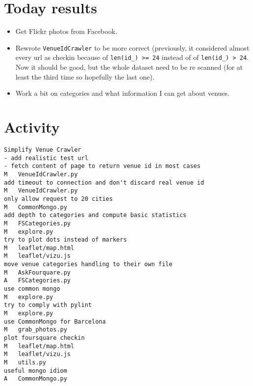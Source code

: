 \section*{Today results}
\begin{itemize}
	\item Get Flickr photos from Facebook.
	\item Rewrote \texttt{VenueIdCrawler} to be more correct (previously, it
		considered almost every url as checkin because of \texttt{len(id\_) >=
		24} instead of of \texttt{len(id\_) > 24}. Now it should be good, but
		the whole dataset need to be re scanned (for at least the third time
		so hopefully the last one).
	\item Work a bit on categories and what information I can get about
		venues.
\end{itemize}

\section*{Activity}
\begin{verbatim}
Simplify Venue Crawler
- add realistic test url
- fetch content of page to return venue id in most cases
M	VenueIdCrawler.py
add timeout to connection and don't discard real venue id
M	VenueIdCrawler.py
only allow request to 20 cities
M	CommonMongo.py
add depth to categories and compute basic statistics
M	FSCategories.py
M	explore.py
try to plot dots instead of markers
M	leaflet/map.html
M	leaflet/vizu.js
move venue categories handling to their own file
M	AskFourquare.py
A	FSCategories.py
use common mongo
M	explore.py
try to comply with pylint
M	explore.py
use CommonMongo for Barcelona
M	grab_photos.py
plot foursquare checkin
M	leaflet/map.html
M	leaflet/vizu.js
M	utils.py
useful mongo idiom
A	CommonMongo.py
\end{verbatim}
